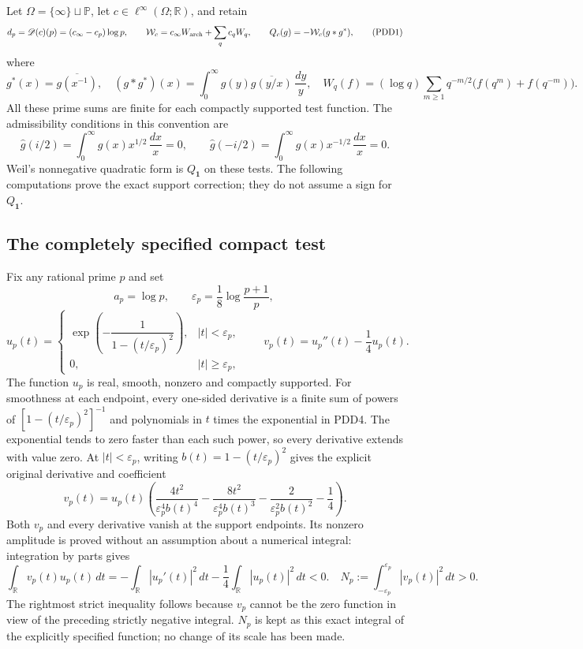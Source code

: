 \documentclass[11pt]{article}
\begin{document}
Let $\Omega=\{\infty\}\sqcup\mathbb P$, let
$c\in\ell^\infty(\Omega;\mathbb R)$, and retain
\[
d_p=\mathscr D(c)(p)=(c_\infty-c_p)\log p,
\qquad
\mathcal W_c=c_\infty W_{\rm arch}+\sum_q c_qW_q,
\qquad Q_c(g)=-\mathcal W_c(g*g^*),
\tag{PDD1}
\]
where
\[
g^*(x)=\overline{g(x^{-1})},\quad
(g*g^*)(x)=\int_0^\infty g(y)\overline{g(y/x)}\,\frac{dy}{y},
\quad
W_q(f)=(\log q)\sum_{m\geq1}q^{-m/2}
\bigl(f(q^m)+f(q^{-m})\bigr).
\tag{PDD2}
\]
All these prime sums are finite for each compactly supported
test function. The admissibility conditions in this
convention are
\[
\widehat g(i/2)=\int_0^\infty g(x)x^{1/2}\,\frac{dx}{x}=0,
\qquad
\widehat g(-i/2)=\int_0^\infty g(x)x^{-1/2}\,\frac{dx}{x}=0.
\tag{PDD3}
\]
Weil's nonnegative quadratic form is $Q_{\mathbf1}$ on
these tests. The following computations prove the exact
support correction; they do not assume a sign for
$Q_{\mathbf1}$.

\subsection{The completely specified compact test}

Fix any rational prime $p$ and set
\[
a_p=\log p,\qquad
\varepsilon_p=\frac18\log\frac{p+1}{p},\qquad
\]
\[
u_p(t)=
\begin{cases}
\exp\!\left(-\dfrac{1}{1-(t/\varepsilon_p)^2}\right),
   &|t|<\varepsilon_p,\\
0,&|t|\geq\varepsilon_p,
\end{cases}
\qquad v_p(t)=u_p''(t)-\frac14u_p(t).
\tag{PDD4}
\]
The function $u_p$ is real, smooth, nonzero and compactly
supported. For smoothness at each endpoint, every one-sided
derivative is a finite sum of powers of
$[1-(t/\varepsilon_p)^2]^{-1}$ and polynomials in $t$
times the exponential in PDD4. The exponential tends to
zero faster than each such power, so every derivative
extends with value zero. At $|t|<\varepsilon_p$, writing
$b(t)=1-(t/\varepsilon_p)^2$ gives the explicit original
derivative and coefficient
\[
v_p(t)=u_p(t)
\left(
\frac{4t^2}{\varepsilon_p^4 b(t)^4}
-\frac{8t^2}{\varepsilon_p^4 b(t)^3}
-\frac{2}{\varepsilon_p^2 b(t)^2}-\frac14
\right).
\tag{PDD5}
\]
Both $v_p$ and every derivative vanish at the support
endpoints. Its nonzero amplitude is proved without an
assumption about a numerical integral: integration by
parts gives
\[
\int_{\mathbb R}v_p(t)u_p(t)\,dt
=-\int_{\mathbb R}|u_p'(t)|^2\,dt
 -\frac14\int_{\mathbb R}|u_p(t)|^2\,dt<0.
\quad
N_p:=\int_{-\varepsilon_p}^{\varepsilon_p}|v_p(t)|^2\,dt>0.
\tag{PDD6}
\]
The rightmost strict inequality follows because $v_p$
cannot be the zero function in view of the preceding
strictly negative integral. $N_p$ is kept as this exact
integral of the explicitly specified function; no change
of its scale has been made.
\end{document}
